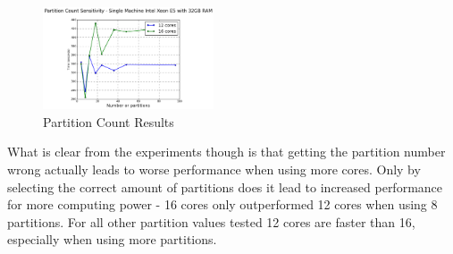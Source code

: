 \begin{figure}
  \centering
  \includegraphics[width=0.45\textwidth]{PartCount}
  \caption{Partition Count Results}
  \label{fig:PartCount}
\end{figure}

What is clear from the experiments though is that getting the partition number wrong actually leads to worse performance when using more cores. Only by selecting the correct amount of partitions does it lead to increased performance for more computing power - 16 cores only outperformed 12 cores when using 8 partitions. For all other partition values tested 12 cores are faster than 16, especially when using more partitions.

